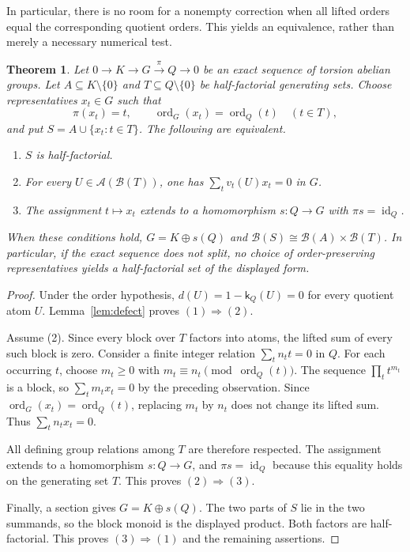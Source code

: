 \documentclass[11pt,reqno]{amsart}
\numberwithin{equation}{section}
\newtheorem{theorem}{Theorem}[section]
\theoremstyle{definition}
\theoremstyle{remark}
\newcommand{\B}{\mathcal B}
\newcommand{\A}{\mathcal A}
\DeclareMathOperator{\ord}{ord}
\begin{document}
In particular, there is no room for a nonempty correction when all
lifted orders equal the corresponding quotient orders. This yields
an equivalence, rather than merely a necessary numerical test.

\begin{theorem}\label{thm:splitting}
Let $0\to K\to G\xrightarrow{\pi}Q\to0$ be an exact sequence
of torsion abelian groups. Let $A\subseteq K\setminus\{0\}$
and $T\subseteq Q\setminus\{0\}$ be half-factorial generating
sets. Choose representatives $x_t\in G$ such that
\[
 \pi(x_t)=t,\qquad \ord_G(x_t)=\ord_Q(t)\quad(t\in T),
\]
and put $S=A\cup\{x_t:t\in T\}$. The following are equivalent.
\begin{enumerate}[label=\textup{(\arabic*)},leftmargin=2.2em]
\item $S$ is half-factorial.
\item For every $U\in\A(\B(T))$, one has
      $\sum_t v_t(U)x_t=0$ in $G$.
\item The assignment $t\mapsto x_t$ extends to a homomorphism
      $s:Q\to G$ with $\pi s=\operatorname{id}_Q$.
\end{enumerate}
When these conditions hold, $G=K\oplus s(Q)$ and
$\B(S)\cong\B(A)\times\B(T)$. In particular, if the exact
sequence does not split, no choice of order-preserving
representatives yields a half-factorial set of the displayed form.
\end{theorem}

\begin{proof}
Under the order hypothesis, $d(U)=1-\mathsf k_Q(U)=0$ for every
quotient atom $U$. Lemma~\ref{lem:defect} proves $(1)\Rightarrow(2)$.

Assume (2). Since every block over $T$ factors into atoms, the
lifted sum of every such block is zero. Consider a finite integer
relation $\sum_t n_t t=0$ in $Q$. For each occurring $t$, choose
$m_t\ge0$ with $m_t\equiv n_t\pmod{\ord_Q(t)}$. The sequence
$\prod_t t^{m_t}$ is a block, so $\sum_t m_tx_t=0$ by the
preceding observation. Since
$\ord_G(x_t)=\ord_Q(t)$, replacing $m_t$ by $n_t$ does not
change its lifted sum. Thus $\sum_t n_tx_t=0$.

All defining group relations among $T$ are therefore respected.
The assignment extends to a homomorphism $s:Q\to G$, and
$\pi s=\operatorname{id}_Q$ because this equality holds on the
generating set $T$. This proves $(2)\Rightarrow(3)$.

Finally, a section gives $G=K\oplus s(Q)$. The two parts of $S$
lie in the two summands, so the block monoid is the displayed
product. Both factors are half-factorial. This proves
$(3)\Rightarrow(1)$ and the remaining assertions.
\end{proof}
\end{document}
